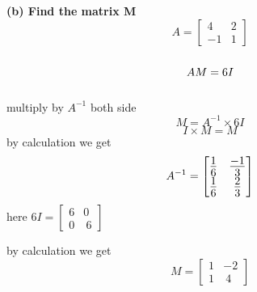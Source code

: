 \documentclass[10pt]{article}
\begin{document}
\begin{multicols}{2}
\begin{flushleft}
\textbf{(b)  Find the matrix M}\\
$$A=\begin{bmatrix}
      4 & 2\\
    -1 & 1
     \end{bmatrix}$$\\
$$\Large AM=6I$$\\
 multiply by $A^{-1}$ both side
 $$M=A^{-1}\times 6I$$  $$ I\times M=M$$
 by calculation we get   $$\Large A^{-1}=\begin{bmatrix}
      \frac{1}{6} & \frac{-1}{3}\\
    \frac{1}{6} & \frac{2}{3}
     \end{bmatrix}$$
\centering here $6I=\begin{bmatrix}
       6&0 \\
    0 & \ 6
     \end{bmatrix}$\\\vspace{5mm}
\raggedright by calculation we get $$M=\begin{bmatrix}
       1&-2 \\
    1 & \ 4
     \end{bmatrix}$$\\
\end{flushleft}
\end{multicols}
\end{document}
